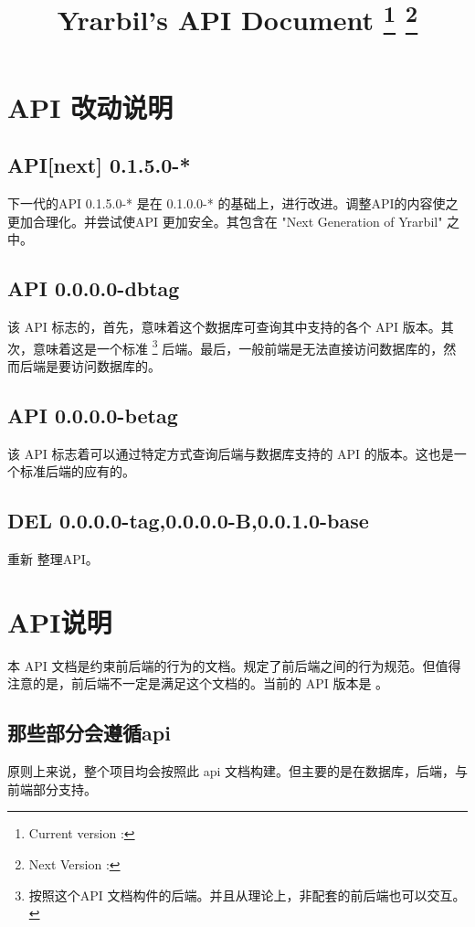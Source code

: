 \documentclass[UTF8]{article}
\title{Yrarbil's API Document \thanks{Current version : \apiver } \thanks{Next Version : \nextapiver }}
\begin{document}
    \maketitle
    \newpage
    
    \tableofcontents
    \newpage
    


    \section{API 改动说明}

    \subsection{API[next] 0.1.5.0-*}
    下一代的API 0.1.5.0-* 是在 0.1.0.0-* 的基础上，进行改进。调整API的内容使之更加合理化。并尝试使API 更加安全。其包含在 "Next Generation of Yrarbil" 之中。

    \subsection{API 0.0.0.0-dbtag}
    该 API 标志的，首先，意味着这个数据库可查询其中支持的各个 API 版本。其次，意味着这是一个标准
      \footnote{按照这个API 文档构件的后端。并且从理论上，非配套的前后端也可以交互。}
    后端。最后，一般前端是无法直接访问数据库的，然而后端是要访问数据库的。

    \subsection{API 0.0.0.0-betag}
    该 API 标志着可以通过特定方式查询后端与数据库支持的 API 的版本。这也是一个标准后端的应有的。

    \subsection{DEL 0.0.0.0-tag,0.0.0.0-B,0.0.1.0-base}
    重新 整理API。

    \section{API说明}
    本 API 文档是约束前后端的行为的文档。规定了前后端之间的行为规范。但值得注意的是，前后端不一定是满足这个文档的。当前的 API 版本是 \apiver 。
    \subsection{那些部分会遵循api}
    原则上来说，整个项目均会按照此 api 文档构建。但主要的是在数据库，后端，与前端部分支持。
\end{document}

